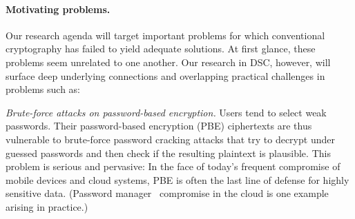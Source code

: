 {\paragraph{Motivating problems.}
Our research agenda will target important problems
for which conventional cryptography has failed to yield adequate solutions.
At first glance, these problems seem unrelated to one another.
Our research in DSC, however, will surface deep underlying connections and overlapping practical challenges in problems such as:


\begin{newitemize}

\item{\em Brute-force attacks on password-based encryption.}
  Users tend to select weak passwords. Their password-based encryption (PBE)
  ciphertexts are thus vulnerable to brute-force password cracking attacks
  that try to decrypt under guessed passwords and then check if the resulting
  plaintext is plausible.  This problem is serious and pervasive: In the face
  of today's frequent compromise of mobile devices and cloud systems, PBE is
  often the last line of defense for highly sensitive data.  (Password
    manager~\cite{whitney11} compromise in the cloud is one example arising in
    practice.)
%


\end{newitemize}}
